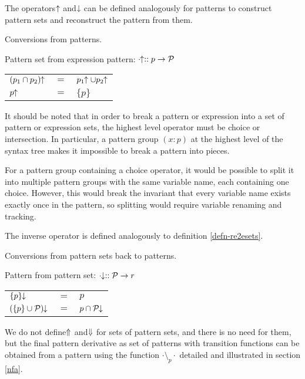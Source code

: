 The operators $\!\!\uparrow$ and $\!\!\downarrow$ can be defined analogously for
patterns to construct pattern sets and reconstruct the pattern from them.

\begin{defn}
   \label{defn-re2pset}
   Conversions from patterns.

   Pattern set from expression pattern:
   $\cdot\!\!\uparrow :: p \to \mathcal{P}$

   \begin{tabular}{lll}
      $(p_1 \cap p_2)\!\!\uparrow$	& $=$	& $p_1\!\!\uparrow \cup p_2\!\!\uparrow$	\\
      $p\!\!\uparrow$			& $=$	& $\{p\}$			\\
   \end{tabular}
\end{defn}

It should be noted that in order to break a pattern or expression into a set of
pattern or expression sets, the highest level operator must be choice or
intersection. In particular, a pattern group $(x:p)$ at the highest level of the
syntax tree makes it impossible to break a pattern into pieces.

For a pattern group containing a choice operator, it would be possible to split
it into multiple pattern groups with the same variable name, each containing one
choice. However, this would break the invariant that every variable name exists
exactly once in the pattern, so splitting would require variable renaming and
tracking.

The inverse operator is defined analogously to definition \ref{defn-re2esets}.

\begin{defn}
   \label{defn-re2psets}
   Conversions from pattern sets back to patterns.

   Pattern from pattern set:
   $\cdot\!\!\downarrow :: \mathcal{P} \to r$

   \begin{tabular}{lll}
      $\{p\}\!\!\downarrow$			& $=$	& $p$				\\
      $(\{p\} \cup \mathcal{P})\!\!\downarrow$	& $=$	& $p \cap \mathcal{P}\!\!\downarrow$	\\
   \end{tabular}
\end{defn}

We do not define $\!\!\Uparrow$ and $\!\!\Downarrow$ for sets of pattern sets, and
there is no need for them, but the final pattern derivative as set of patterns
with transition functions can be obtained from a pattern using the function
$\cdot \setminus_p \cdot$ detailed and illustrated in section \ref{nfa}.



